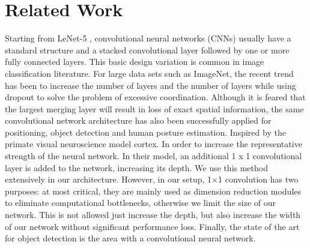\documentclass[10pt,twocolumn,letterpaper]{article}
\begin{document}
\section{Related Work}
Starting from LeNet-5 \cite{LeCun_1989_Backpropagation}, convolutional neural networks (CNNs) usually have a standard structure and a stacked convolutional layer followed by one or more fully connected layers. This basic design variation is common in image classification literature. For large data sets such as ImageNet, the recent trend has been to increase the number of layers and the number of layers  while using dropout to solve the problem of excessive coordination. Although it is feared that the largest merging layer will result in loss of exact spatial information, the same convolutional network architecture\cite{Krizhevsky_2012_ImageNet} has also been successfully applied for positioning\cite{Krizhevsky_2012_ImageNet}, object detection \cite{Girshick2014Rich}and human posture estimation. Inspired by the primate visual neuroscience model cortex. In order to increase the representative strength of the neural network. In their model, an additional 1 x 1 convolutional layer is added to the network, increasing its depth. We use this method extensively in our architecture. However, in our setup, 1×1 convolution has two purposes: at most critical, they are mainly used as dimension reduction modules to eliminate computational bottlenecks, otherwise we limit the size of our network. This is not allowed just increase the depth, but also increase the width of our network without significant performance loss. Finally, the state of the art for object detection is the area with a convolutional neural network.
\end{document}
